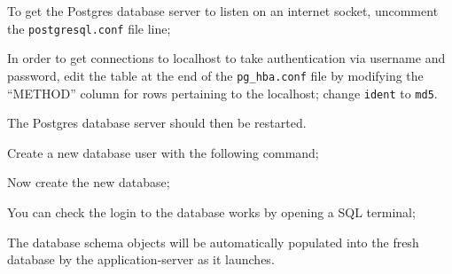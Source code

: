 To get the Postgres database server to listen on an internet socket, uncomment the {\tt postgresql.conf} file line;


In order to get connections to localhost to take authentication via username and password, edit the table at the end of the {\tt pg\_hba.conf} file by modifying the ``METHOD'' column for rows pertaining to the localhost; change {\tt ident} to {\tt md5}.

The Postgres database server should then be restarted.

Create a new database user with the following command;


Now create the new database;


You can check the login to the database works by opening a SQL terminal;


The database schema objects will be automatically populated into the fresh database by the application-server as it launches.

